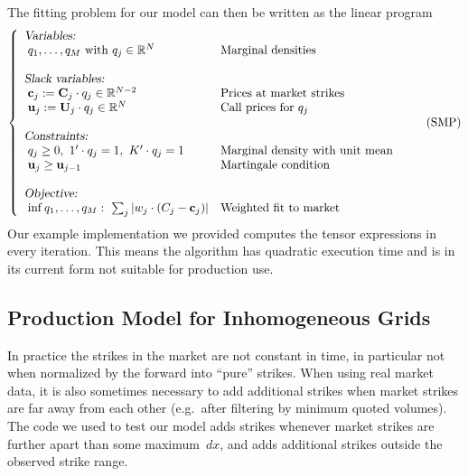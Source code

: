 \documentclass[twoside]{article}
\DeclareRobustCommand{\R}{\mathbb{R}}
\theoremstyle{plain}
\theoremstyle{definition}
\theoremstyle{remark}
\begin{document}
The fitting problem for our model can then be written as the linear program
\begin{equation}\label{eq:prob_homog}
\left\{
    \begin{array}{lll}
        \mbox{\textsl{Variables:}}
        \\
        \hspace{0.1cm}q_1,\ldots,q_M\ \mbox{with} \ q_j \in \R^{N} & \mbox{Marginal densities}\\
        \\
        \mbox{\textsl{Slack variables:}}
        \\
        \hspace{0.1cm}\mathbf{c}_j := \mathbf{C}_j \cdot q_j  \in \R^{N-2}  & \mbox{Prices at market strikes}\\
        \hspace{0.1cm} \mathbf{u}_j :=  \mathbf{U}_j \cdot q_j  \in \R^{N} &
        \mbox{Call prices for~$q_j$}\\
        \\
        \mbox{\textsl{Constraints:}}\\
           \hspace{0.1cm} q_j \geq 0 , \ 1'\cdot q_j = 1,  \ K'\cdot q_j = 1 & \mbox{Marginal 
            density with unit mean}\\
           \hspace{0.1cm}\mathbf{u}_j  \geq \mathbf{u}_{j-1}
        & \mbox{Martingale condition} \\  \\
        \mbox{\textsl{Objective:}} \\
        \hspace{0.1cm}\inf q_1,\ldots,q_M:\  \sum_j \left| w_j \cdot (C_j -\mathbf{c}_j)  \right|  
        & \mbox{Weighted fit to market}
    \end{array}
    \right.  \tag{SMP}
\end{equation}
Our example implementation we provided computes the tensor expressions in every iteration. This
means the algorithm has quadratic execution time and is in its current form not suitable
for production use.

\subsection{Production Model for Inhomogeneous Grids}\label{sec:PROD}

In practice the strikes in the market are not constant in time, in particular not when normalized by the forward
into ``pure'' strikes. When using real market data, it is also sometimes
necessary to add additional strikes when market strikes are far away from each other
(e.g.~after filtering by minimum quoted volumes). The code we used to test our
model adds strikes whenever market strikes are further apart than some maximum~$dx$,
and adds additional strikes outside the observed strike range.
\end{document}
